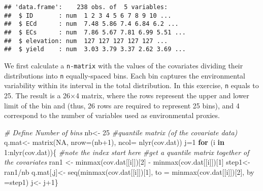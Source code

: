 \documentclass[
]{book}
\newenvironment{Shaded}{\begin{snugshade}}{\end{snugshade}}
\newcommand{\AttributeTok}[1]{\textcolor[rgb]{0.77,0.63,0.00}{#1}}
\newcommand{\CommentTok}[1]{\textcolor[rgb]{0.56,0.35,0.01}{\textit{#1}}}
\newcommand{\ConstantTok}[1]{\textcolor[rgb]{0.00,0.00,0.00}{#1}}
\newcommand{\ControlFlowTok}[1]{\textcolor[rgb]{0.13,0.29,0.53}{\textbf{#1}}}
\newcommand{\DecValTok}[1]{\textcolor[rgb]{0.00,0.00,0.81}{#1}}
\newcommand{\FunctionTok}[1]{\textcolor[rgb]{0.00,0.00,0.00}{#1}}
\newcommand{\NormalTok}[1]{#1}
\newcommand{\OtherTok}[1]{\textcolor[rgb]{0.56,0.35,0.01}{#1}}
\newcommand{\SpecialCharTok}[1]{\textcolor[rgb]{0.00,0.00,0.00}{#1}}
\begin{document}
\begin{verbatim}
## 'data.frame':    238 obs. of  5 variables:
##  $ ID       : num  1 2 3 4 5 6 7 8 9 10 ...
##  $ ECd      : num  7.48 5.86 7.4 6.84 6.2 ...
##  $ ECs      : num  7.86 5.67 7.81 6.99 5.51 ...
##  $ elevation: num  127 127 127 127 127 ...
##  $ yield    : num  3.03 3.79 3.37 2.62 3.69 ...
\end{verbatim}

We first calculate a \texttt{n-matrix} with the values of the covariates dividing their distributions into \texttt{n} equally-spaced bins. Each bin captures the environmental variability within its interval in the total distribution. In this exercise, \texttt{n} equals to 25. The result is a 26×4 matrix, where the rows represent the upper and lower limit of the bin and (thus, 26 rows are required to represent 25 bins), and 4 correspond to the number of variables used as environmental proxies.

\begin{Shaded}
\begin{Highlighting}[]
\CommentTok{\# Define Number of bins}
\NormalTok{  nb}\OtherTok{\textless{}{-}} \DecValTok{25}
  \CommentTok{\#quantile matrix (of the covariate data)}
\NormalTok{  q.mat}\OtherTok{\textless{}{-}} \FunctionTok{matrix}\NormalTok{(}\ConstantTok{NA}\NormalTok{, }\AttributeTok{nrow=}\NormalTok{(nb}\SpecialCharTok{+}\DecValTok{1}\NormalTok{), }\AttributeTok{ncol=} \FunctionTok{nlyr}\NormalTok{(cov.dat))}
\NormalTok{  j}\OtherTok{=}\DecValTok{1}
  \ControlFlowTok{for}\NormalTok{ (i }\ControlFlowTok{in} \DecValTok{1}\SpecialCharTok{:}\FunctionTok{nlyr}\NormalTok{(cov.dat))\{ }\CommentTok{\#note the index start here}
  \CommentTok{\#get a quantile matrix together of the covariates}
\NormalTok{    ran1 }\OtherTok{\textless{}{-}} \FunctionTok{minmax}\NormalTok{(cov.dat[[i]])[}\DecValTok{2}\NormalTok{] }\SpecialCharTok{{-}} \FunctionTok{minmax}\NormalTok{(cov.dat[[i]])[}\DecValTok{1}\NormalTok{]}
\NormalTok{    step1}\OtherTok{\textless{}{-}}\NormalTok{ ran1}\SpecialCharTok{/}\NormalTok{nb }
\NormalTok{    q.mat[,j]}\OtherTok{\textless{}{-}} \FunctionTok{seq}\NormalTok{(}\FunctionTok{minmax}\NormalTok{(cov.dat[[i]])[}\DecValTok{1}\NormalTok{], }\AttributeTok{to =} \FunctionTok{minmax}\NormalTok{(cov.dat[[i]])[}\DecValTok{2}\NormalTok{], }\AttributeTok{by =}\NormalTok{step1)}
\NormalTok{    j}\OtherTok{\textless{}{-}}\NormalTok{ j}\SpecialCharTok{+}\DecValTok{1}\NormalTok{\}}
\end{Highlighting}
\end{Shaded}
\end{document}
